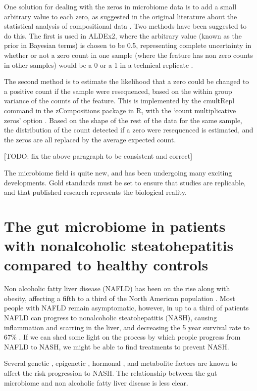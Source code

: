 One solution for dealing with the zeros in microbiome data is to add a small arbitrary value to each zero, as suggested in the original literature about the statistical analysis of compositional data \cite{aitchison1982statistical}. Two methods have been suggested to do this. The first is used in ALDEx2, where the arbitrary value (known as the prior in Bayesian terms) is chosen to be 0.5, representing complete uncertainty in whether or not a zero count in one sample (where the feature has non zero counts in other samples) would be a 0 or a 1 in a technical replicate \cite{fernandes2013anova}.

The second method is to estimate the likelihood that a zero could be changed to a positive count if the sample were resequenced, based on the within group variance of the counts of the feature. This is implemented by the cmultRepl command in the zCompositions package in R, with the `count multiplicative zeros' option \cite{palarea2015zcompositions}. Based on the shape of the rest of the data for the same sample, the distribution of the count detected if a zero were resequenced is estimated, and the zeros are all replaced by the average expected count.

[TODO: fix the above paragraph to be consistent and correct]

The microbiome field is quite new, and has been undergoing many exciting developments. Gold standards must be set to ensure that studies are replicable, and that published research represents the biological reality.

\section{The gut microbiome in patients with nonalcoholic steatohepatitis compared to healthy controls}

Non alcoholic fatty liver disease (NAFLD) has been on the rise along with obesity, affecting a fifth to a third of the North American population \cite{preiss2008non}. Most people with NAFLD remain asymptomatic, however, in up to a third of patients NAFLD can progress to nonalcoholic steatohepatitis (NASH), causing inflammation and scarring in the liver, and decreasing the 5 year survival rate to 67\% \cite{propst1995prognosis}. If we can shed some light on the process by which people progress from NAFLD to NASH, we might be able to find treatments to prevent NASH.

Several genetic \cite{sookoian2011meta} \cite{rivera2007toll}, epigenetic \cite{murphy2013relationship}, hormonal \cite{yasuda1999suppressive}, and metabolite \cite{raman2013fecal} factors are known to affect the risk progression to NASH. The relationship between the gut microbiome and non alcoholic fatty liver disease is less clear.

